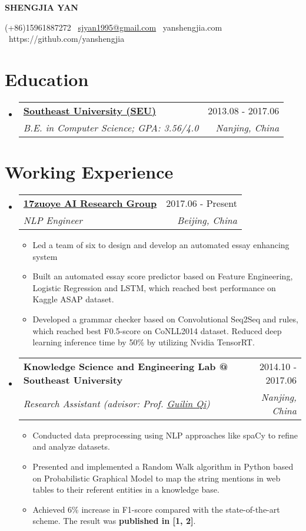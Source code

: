 \documentclass[letterpaper, 11pt]{article}
\makeatletter
\newcommand{\resumeSingleSubItem}[1]{
   \item\small{#1} \vspace{-3pt}
}
\newcommand{\resumeSubheading}[4]{
  \vspace{-2pt}\item
    \begin{tabular*}{0.97\textwidth}[t]{l@{\extracolsep{\fill}}r}
      \textbf{#1} & #2 \\
      \textit{\small#3} & \textit{\small #4} \\
    \end{tabular*}\vspace{-7pt}
}
\newcommand{\resumeSubHeadingListStart}{\begin{itemize}[leftmargin=*]}
\newcommand{\resumeSubHeadingListEnd}{\end{itemize}\vspace{-9.6pt}}
\newcommand{\resumeItemListStart}{\begin{itemize}[leftmargin=*]}
\newcommand{\resumeItemListEnd}{\end{itemize}\vspace{-5pt}}
\newcommand{\name}[1]{
  \centerline{\huge \textbf{#1}}
  \vspace{1.25ex}
}
\makeatother
\begin{document}
\name{SHENGJIA YAN}
\centerline{(+86)15961887272 \textperiodcentered\ \href{mailto:sjyan1995@gmail.com}{sjyan1995@gmail.com} \textperiodcentered\ yanshengjia.com \textperiodcentered\ https://github.com/yanshengjia}


\section{Education}
    \resumeSubHeadingListStart
        \resumeSubheading
        {\href{http://www.seu.edu.cn/}{Southeast University (SEU)}}{2013.08 - 2017.06}
        {B.E. in Computer Science;  GPA: 3.56/4.0}{Nanjing, China}
    \resumeSubHeadingListEnd

\section{Working Experience}
    \resumeSubHeadingListStart

    \resumeSubheading
        {\href{https://17zuoye.com}{17zuoye AI Research Group}}{2017.06 - Present}
        {NLP Engineer}{Beijing, China}
        \resumeItemListStart
            \resumeSingleSubItem{Led a team of six to design and develop an automated essay enhancing system}
            \resumeSingleSubItem{Built an automated essay score predictor based on Feature Engineering, Logistic Regression and LSTM, which reached best performance on Kaggle ASAP dataset.}
            \resumeSingleSubItem{Developed a grammar checker based on Convolutional Seq2Seq and rules, which reached best F0.5-score on CoNLL2014 dataset. Reduced deep learning inference time by 50\% by utilizing Nvidia TensorRT.}
        \resumeItemListEnd

    \resumeSubheading
        {Knowledge Science and Engineering Lab @ Southeast University}{2014.10 - 2017.06}
        {Research Assistant (advisor: Prof. \href{http://cse.seu.edu.cn/PersonalPage/qgl/index.htm}{Guilin Qi})}{Nanjing, China}
        \resumeItemListStart
            \resumeSingleSubItem
                {Conducted data preprocessing using NLP approaches like spaCy to refine and analyze datasets.}
            \resumeSingleSubItem
                {Presented and implemented a Random Walk algorithm in Python based on Probabilistic Graphical Model to map the string mentions in web tables to their referent entities in a knowledge base.}
            \resumeSingleSubItem
                {Achieved 6\% increase in F1-score compared with the state-of-the-art scheme. The result was \textbf{published in [1, 2]}.}
        \resumeItemListEnd
    \resumeSubHeadingListEnd
\end{document}
